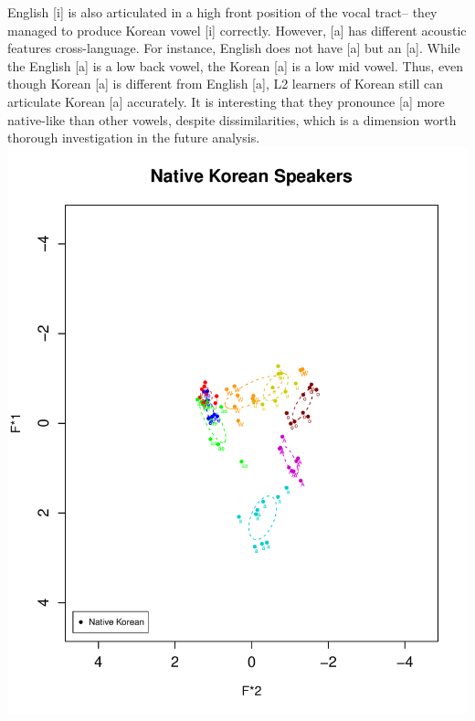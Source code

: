 \documentclass[man, fleqn, noextraspace]{apa6}
\begin{document}
English {[}i{]} is also articulated in a high front position of the
vocal tract-- they managed to produce Korean vowel {[}i{]} correctly.
However, {[}a{]} has different acoustic features cross-language. For
instance, English does not have {[}a{]} but an {[}a{]}. While the
English {[}a{]} is a low back vowel, the Korean {[}a{]} is a low mid
vowel. Thus, even though Korean {[}a{]} is different from English
{[}a{]}, L2 learners of Korean still can articulate Korean {[}a{]}
accurately. It is interesting that they pronounce {[}a{]} more
native-like than other vowels, despite dissimilarities, which is a
dimension worth thorough investigation in the future analysis.
\includegraphics{Group_5_Final_paper_files/figure-latex/Vowel Charts of All Speakers-1.pdf}
\end{document}
